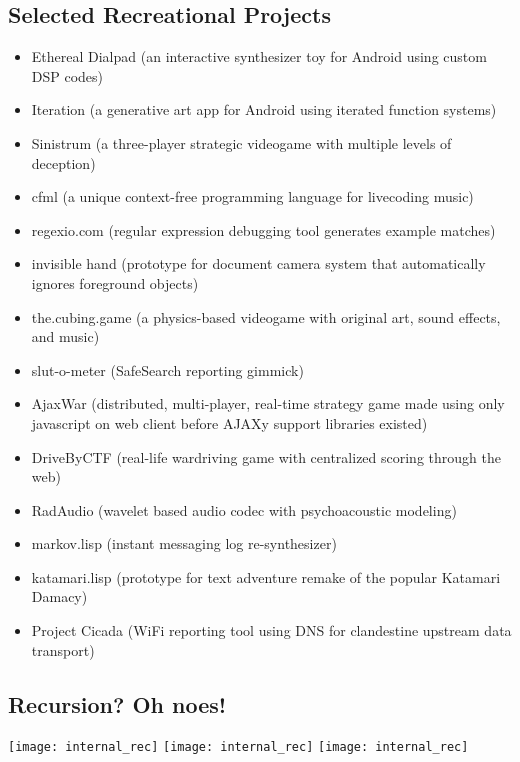 \documentclass[12pt]{article}
\begin{document}
\subsection*{Selected Recreational Projects}
\begin{itemize}
  \item Ethereal Dialpad (an interactive synthesizer toy for Android using custom DSP codes)
  \item Iteration (a generative art app for Android using iterated function systems)
  \item Sinistrum (a three-player strategic videogame with multiple levels of deception)
  \item cfml (a unique context-free programming language for livecoding music)
  \item regexio.com (regular expression debugging tool generates example matches)
  \item invisible hand (prototype for document camera system that automatically ignores foreground objects)
  \item the.cubing.game (a physics-based videogame with original art, sound effects, and music)
  \item slut-o-meter (SafeSearch reporting gimmick)
  \item AjaxWar (distributed, multi-player,  real-time strategy game made using only javascript on web client before AJAXy support libraries existed)
  \item DriveByCTF (real-life wardriving game with centralized scoring through the web)
  \item RadAudio (wavelet based audio codec with psychoacoustic modeling)
  \item markov.lisp (instant messaging log re-synthesizer)
  \item katamari.lisp (prototype for text adventure remake of the popular Katamari Damacy)
  \item Project Cicada (WiFi reporting tool using DNS for clandestine upstream data transport)
\end{itemize}

\subsection*{Recursion? Oh noes!}
\begin{minipage}{\textwidth}
\texttt{[image: internal\_rec]}
\texttt{[image: internal\_rec]}
\texttt{[image: internal\_rec]}
\end{minipage}
\end{document}
